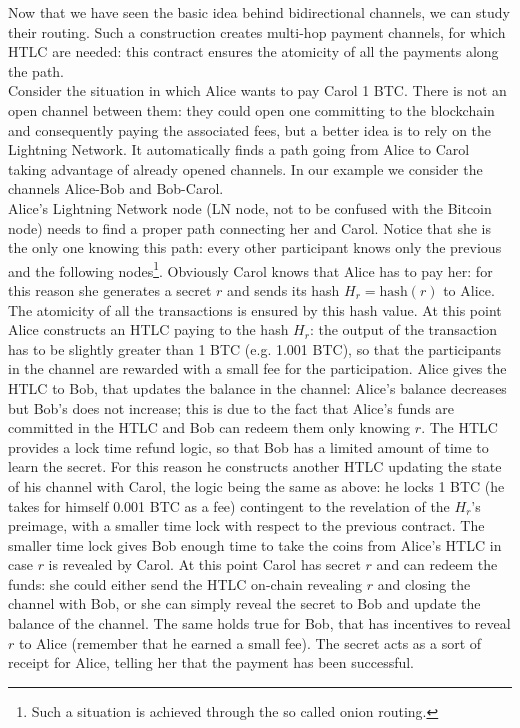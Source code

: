 \bigskip
\noindent
Now that we have seen the basic idea behind bidirectional channels, we can study their routing. Such a construction creates multi-hop payment channels, for which HTLC are needed: this contract ensures the atomicity of all the payments along the path.
\\
Consider the situation in which Alice wants to pay Carol 1 BTC. There is not an open channel between them: they could open one committing to the blockchain and consequently paying the associated fees, but a better idea is to rely on the Lightning Network. It automatically finds a path going from Alice to Carol taking advantage of already opened channels. In our example we consider the channels Alice-Bob and Bob-Carol.
\\
Alice's Lightning Network node (LN node, not to be confused with the Bitcoin node) needs to find a proper path connecting her and Carol. Notice that she is the only one knowing this path: every other participant knows only the previous and the following nodes\footnote{Such a situation is achieved through the so called onion routing.}. Obviously Carol knows that Alice has to pay her: for this reason she generates a secret $r$ and sends its hash $H_r = \text{hash}(r)$ to Alice. The atomicity of all the transactions is ensured by this hash value. At this point Alice constructs an HTLC paying to the hash $H_r$: the output of the transaction has to be slightly greater than 1 BTC (e.g. 1.001 BTC), so that the participants in the channel are rewarded with a small fee for the participation. Alice gives the HTLC to Bob, that updates the balance in the channel: Alice's balance decreases but Bob's does not increase; this is due to the fact that Alice's funds are committed in the HTLC and Bob can redeem them only knowing $r$. The HTLC provides a lock time refund logic, so that Bob has a limited amount of time to learn the secret. For this reason he constructs another HTLC updating the state of his channel with Carol, the logic being the same as above: he locks 1 BTC (he takes for himself 0.001 BTC as a fee) contingent to the revelation of the $H_r$'s preimage, with a smaller time lock with respect to the previous contract. The smaller time lock gives Bob enough time to take the coins from Alice's HTLC in case $r$ is revealed by Carol. At this point Carol has secret $r$ and can redeem the funds: she could either send the HTLC on-chain revealing $r$ and closing the channel with Bob, or she can simply reveal the secret to Bob and update the balance of the channel. The same holds true for Bob, that has incentives to reveal $r$ to Alice (remember that he earned a small fee). The secret acts as a sort of receipt for Alice, telling her that the payment has been successful.


